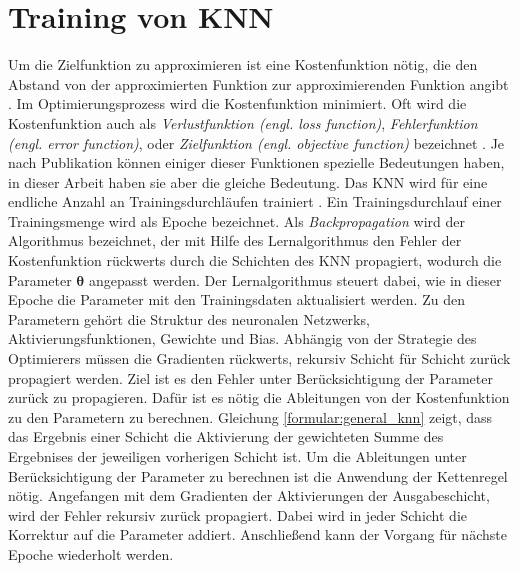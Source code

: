 \section{Training von KNN}
Um die Zielfunktion zu approximieren ist eine Kostenfunktion nötig, die den Abstand von der approximierten Funktion zur approximierenden Funktion angibt \cite{nielsenneural}.
Im Optimierungsprozess wird die Kostenfunktion minimiert. 
Oft wird die Kostenfunktion auch als \textit{Verlustfunktion (engl. loss function)}, \textit{Fehlerfunktion (engl. error function)},
oder \textit{Zielfunktion (engl. objective function)} bezeichnet \cite{bengio2017deep}.
Je nach Publikation können einiger dieser Funktionen spezielle Bedeutungen haben, in dieser Arbeit haben sie aber die gleiche Bedeutung.
\newline
\newline
Das KNN wird für eine endliche Anzahl an Trainingsdurchläufen trainiert \cite{nielsenneural}.
Ein Trainingsdurchlauf einer Trainingsmenge wird als Epoche bezeichnet.
Als \textit{Backpropagation} wird der Algorithmus bezeichnet, der mit Hilfe des Lernalgorithmus den Fehler der
Kostenfunktion rückwerts durch die Schichten des KNN propagiert, wodurch die Parameter $\boldsymbol\theta$ angepasst werden.
Der Lernalgorithmus steuert dabei, wie in dieser Epoche die Parameter mit den Trainingsdaten aktualisiert werden.
Zu den Parametern gehört die Struktur des neuronalen Netzwerks, Aktivierungsfunktionen, Gewichte und Bias.
\newline
\newline
Abhängig von der Strategie des Optimierers müssen die Gradienten rückwerts, rekursiv Schicht für Schicht zurück propagiert werden.
Ziel ist es den Fehler unter Berücksichtigung der Parameter zurück zu propagieren.
Dafür ist es nötig die Ableitungen von der Kostenfunktion zu den Parametern zu berechnen.
Gleichung \ref{formular:general_knn} zeigt, dass das Ergebnis einer Schicht die Aktivierung der gewichteten Summe des
Ergebnises der jeweiligen vorherigen Schicht ist.
Um die Ableitungen unter Berücksichtigung der Parameter zu berechnen ist die Anwendung der Kettenregel nötig.
\newline
\newline
Angefangen mit dem Gradienten der Aktivierungen der Ausgabeschicht, wird der Fehler rekursiv zurück propagiert.
Dabei wird in jeder Schicht die Korrektur auf die Parameter addiert.
Anschließend kann der Vorgang für nächste Epoche wiederholt werden.
